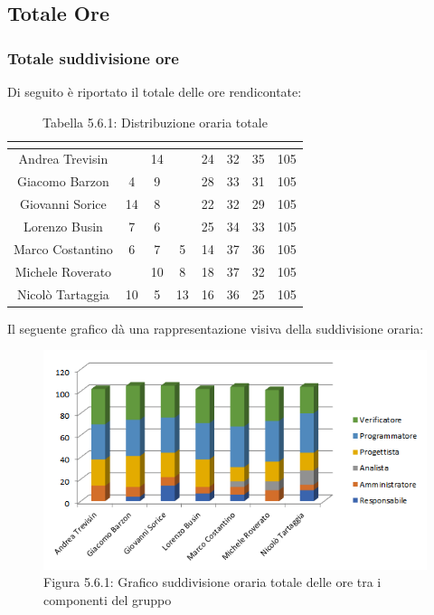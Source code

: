 \subsection{Totale Ore}

\subsubsection{Totale suddivisione ore}
Di seguito è riportato il totale delle ore rendicontate:

\renewcommand{\arraystretch}{1.5}
\begin{table}[H]
\begin{center}
\begin{tabular}{|c|c|c|c|c|c|c|c|}
\hline
\rowcolor{title_row}
\textbf{\color{title_text}{Nome}} & \textbf{\color{title_text}{Resp.}} & \textbf{\color{title_text}{Ammi.}} & \textbf{\color{title_text}{Analist.}} & \textbf{\color{title_text}{Progett.}} & \textbf{\color{title_text}{Program.}} & \textbf{\color{title_text}{Verific.}} & \textbf{\color{title_text}{Totale}} \\ \hline
Andrea Trevisin  & & 14 & & 24 & 32 & 35 & 105  \\ \hline
Giacomo Barzon   & 4 & 9 & & 28 & 33 & 31 & 105  \\ \hline
Giovanni Sorice  & 14 & 8 & & 22 & 32 & 29 & 105 \\ \hline
Lorenzo Busin    & 7 & 6 & & 25 & 34 & 33 & 105 \\ \hline
Marco Costantino & 6 & 7 & 5 & 14 & 37 & 36 & 105 \\ \hline
Michele Roverato & & 10 & 8 & 18 & 37 & 32 & 105 \\ \hline
Nicolò Tartaggia & 10 & 5 & 13 & 16 & 36 & 25 & 105  \\ \hline
\end{tabular}
\caption{Tabella 5.6.1: Distribuzione oraria totale\label{}}
\end{center}
\end{table}
\renewcommand{\arraystretch}{1}

Il seguente grafico dà una rappresentazione visiva della suddivisione oraria: \\
\begin{figure} [H]
	\centering
	\includegraphics[scale=1]{Res/ExcelGrafici/Grafici/TotaleOre.png}
	\caption{Figura 5.6.1: Grafico suddivisione oraria totale delle ore tra i componenti del gruppo}\label{}
\end{figure}

